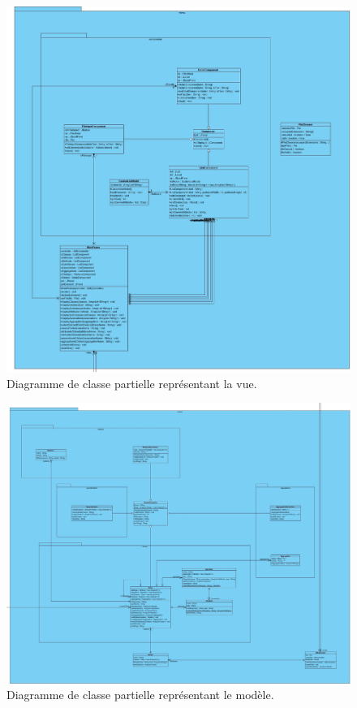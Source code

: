 \documentclass[12pt]{article} %
\begin{document}
\begin{figure}[h]
  \includegraphics[width=\linewidth]{img/ClassDiagram-View.jpg}
  \caption{Diagramme de classe partielle représentant la vue.}
  \label{fig:classdiagram-view}
\end{figure}
\begin{figure}[h]
  \includegraphics[width=\linewidth]{img/ClassDiagram-Model.jpg}
  \caption{Diagramme de classe partielle représentant le modèle.}
  \label{fig:classdiagram-model}
\end{figure}
\end{document}
